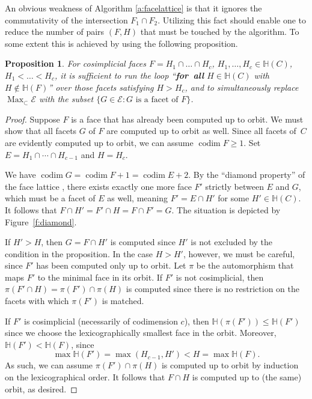 \documentclass[12pt]{amsart}
\newtheorem{prop}[thm]{Proposition}
\theoremstyle{definition}
\numberwithin{equation}{section}
\renewcommand\>{\rangle}
\newcommand\<{\langle}
\newcommand\0{\mathbf{0}}
\def\HH{{\mathbb H}}
\def\cE{{\mathcal E}}
\def\codim{\operatorname{codim}}
\begin{document}
An obvious weakness of Algorithm \ref{a:facelattice} is that it ignores the commutativity of the intersection $F_1\cap F_2$.  Utilizing this fact should enable one to reduce the number of pairs $(F,H)$ that must be touched by the algorithm. To some extent this is achieved by using the following proposition.

\begin{prop}\label{p:facetrestriction}
For cosimplicial faces $F=H_1\cap\dots\cap H_c$, $H_1,\dots,H_c\in\HH(C)$, $H_1<\dots<H_c$,  it is sufficient to run the loop ``\textbf{for~all} $H \in \HH(C)$ with $H \notin \HH(F)$'' over those facets satisfying $H > H_c$, and to simultaneously replace $\operatorname{Max}_\subset\cE$ with the subset $\{G \in \cE : G \text{ is a facet of } F \}$.
\end{prop} 

\begin{proof}
Suppose $F$ is a face that has already been computed up to orbit. We must show that all facets $G$ of $F$ are computed up to orbit as well. Since all facets of~$C$ are evidently computed up to orbit, we can assume $\codim F\ge 1$. Set $E = H_1 \cap \cdots \cap H_{c-1}$ and $H = H_c$. 

We have $\codim G=\codim F+1=\codim E+2$. By the ``diamond property'' of the face lattice \cite[Theorem~2.7(c)]{Ziegler}, there exists exactly one more face $F'$ strictly between $E$ and $G$, which must be a facet of $E$ as well, meaning $F' = E \cap H'$ for some $H'\in \HH(C)$.  It follows that $F \cap H' = F' \cap H = F \cap F' = G$. The situation is depicted by Figure~\ref{f:diamond}.

If $H'>H$, then $G = F \cap H'$ is computed since $H'$ is not excluded by the condition in the proposition. In the case $H > H'$, however, we must be careful, since $F'$ has been computed only up to orbit. Let $\pi$ be the automorphism that maps $F'$ to the minimal face in its orbit. If $F'$ is not cosimplicial, then $\pi(F' \cap H) = \pi(F') \cap \pi(H)$ is computed since there is no restriction on the facets with which $\pi(F')$ is matched.  

If $F'$ is cosimplicial (necessarily of codimension $c$), then $\HH(\pi(F')) \le \HH(F')$ since we choose the lexicographically smallest face in the orbit. Moreover, $\HH(F') < \HH(F)$, since 
$$\max \HH(F') = \max(H_{c-1}, H') < H = \max \HH(F).$$
As such, we can assume $\pi(F') \cap \pi(H)$ is computed up to orbit by induction on the lexicographical order. It follows that $F \cap H$ is computed up to (the same) orbit, as desired.
\end{proof}
\end{document}
